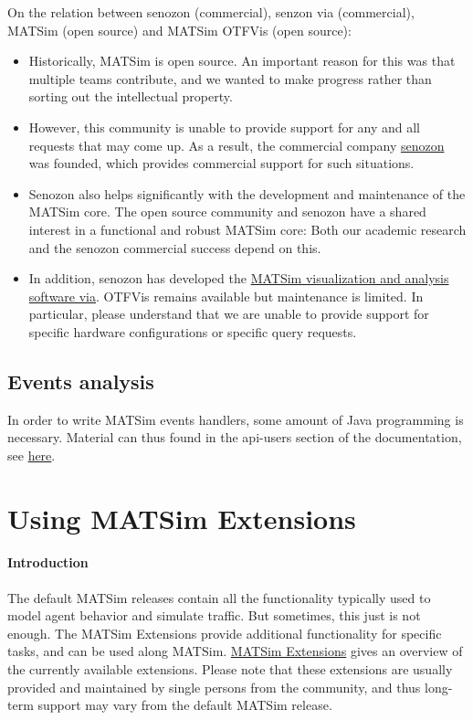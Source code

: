\documentclass[a4paper,11pt]{report}
\begin{document}
On the relation between senozon (commercial), senzon via (commercial), MATSim (open source) and MATSim OTFVis (open source):
\begin{itemize}
	\item Historically, MATSim is open source. An important reason  for this was that multiple teams contribute, and we wanted to make  progress rather than sorting out the intellectual property.
	\item However, this community is unable to provide support for any and all  requests that may come up. As a result, the commercial company \href{http://www.senzon.com/}{senozon} was founded, which provides commercial support for such situations.
	\item Senozon also helps significantly with the development and  maintenance of the MATSim core. The open source community and senozon  have a shared interest in a functional and robust MATSim core: Both our  academic research and the senozon commercial success depend on this.
	\item In addition, senozon has developed the \href{http://senozon.com/products/via}{MATSim visualization and analysis software via}.  OTFVis remains available but maintenance is limited. In  particular, please understand that we are unable to provide support for  specific hardware configurations or specific query requests.
\end{itemize}

\vfill\eject
\section{Events analysis}

In  order to write MATSim events handlers, some amount of Java programming  is necessary. Material can thus found in the api-users section of  the documentation, see \href{http://www.matsim.org/node/17}{here}.

\chapter{Using MATSim Extensions}

\subsubsection{Introduction}

The default MATSim releases contain all the functionality typically  used to model agent behavior and simulate traffic. But sometimes, this  just is not enough. The MATSim Extensions provide additional  functionality for specific tasks, and can be used along MATSim. \href{http://www.matsim.org/extensions}{MATSim Extensions}  gives an overview of the currently available extensions. Please note  that these extensions are usually provided and maintained by single  persons from the community, and thus long-term support may vary from the  default MATSim release.
\end{document}

